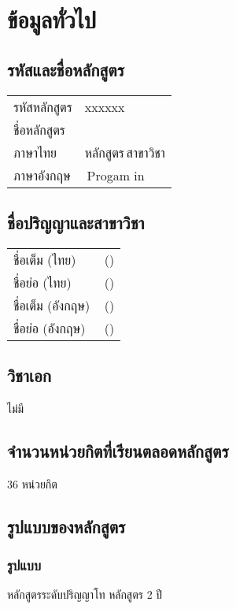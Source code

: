 \cleardoublepage
\setcounter{page}{1}
\pagestyle{headings}

\chapter{ข้อมูลทั่วไป}

\section{รหัสและชื่อหลักสูตร}

\begin{tabular}{p{}p{}}
	รหัสหลักสูตร & xxxxxx\\
	ชื่อหลักสูตร & \\
	ภาษาไทย & หลักสูตร\thdegree\,สาขาวิชา\thdegreebranch \\
	ภาษาอังกฤษ & \engdegree\,Progam in \engdegreebranch
\end{tabular}

\section{ชื่อปริญญาและสาขาวิชา}

\begin{tabular}{p{}p{}}
	ชื่อเต็ม (ไทย) & \thdegree\,(\thdegreebranch)\\
	ชื่อย่อ (ไทย) & \thshortdegree\,(\thdegreebranch)\\
	ชื่อเต็ม (อังกฤษ) & \engdegree\,(\engdegreebranch)\\
	ชื่อย่อ (อังกฤษ) & \engshortdegree\,(\engdegreebranch)\\
\end{tabular}

\section{วิชาเอก}
ไม่มี

\section{จำนวนหน่วยกิตที่เรียนตลอดหลักสูตร}
36 หน่วยกิต

\section{รูปแบบของหลักสูตร}

\subsection{รูปแบบ}
หลักสูตรระดับปริญญาโท หลักสูตร 2 ปี

